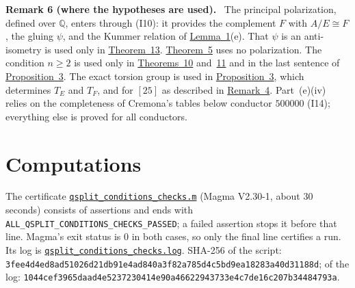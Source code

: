 \documentclass[11pt]{article}
\newenvironment{statement}[1]{\par\medskip\noindent\phantomsection\textbf{#1}\ }{\par\medskip}
\newcommand{\Q}{\mathbb Q}
\begin{document}
\begin{statement}{Remark 6 (where the hypotheses are used).}\label{rem-hyp}
The principal polarization, defined over \(\Q\), enters through (I10): it provides the complement \(F\) with
\(A/E\cong F\), the gluing \(\psi\), and the Kummer relation of \hyperref[lemma-gluing]{Lemma~1}(e). That \(\psi\) is
an anti-isometry is used only in \hyperref[thm-samej]{Theorem~13}. \hyperref[thm-isotypic]{Theorem~5} uses no
polarization. The condition \(n\ge2\) is used only in \hyperref[thm-22212]{Theorems~10} and~\hyperref[thm-228]{11} and in the
last sentence of \hyperref[prop-parents]{Proposition~3}.
The exact torsion group is used in \hyperref[prop-parents]{Proposition~3}, which determines \(T_E\) and \(T_F\), and
for \([25]\) as described in \hyperref[rem-trace]{Remark~4}. Part~(e)(iv) relies on the completeness of Cremona's
tables below conductor \(500000\) (I14); everything else is proved for all conductors.
\end{statement}

\section{Computations}\label{computations}

The certificate
\href{https://genus-2-torsion.github.io/data/knowledge/sources/qsplit_conditions_checks.m}{\texttt{qsplit\_conditions\_checks.m}}
(Magma V2.30-1, about \(30\) seconds) consists of assertions and ends with
\texttt{ALL\_QSPLIT\_CONDITIONS\_CHECKS\_PASSED}; a failed assertion stops it before that line. Magma's exit status is
\(0\) in both cases, so only the final line certifies a run. Its log is
\href{https://genus-2-torsion.github.io/data/knowledge/sources/qsplit_conditions_checks.log}{\texttt{qsplit\_conditions\_checks.log}}.
SHA-256 of the script:
\texttt{3fee4d4ed8ad5102\allowbreak 6d21db91e4ad840a\allowbreak 3f82a785d4c5bd9e\allowbreak a18283a40d31188d};
of the log:
\texttt{1044cef3965daad4\allowbreak e5237230414e90a4\allowbreak 6622943733e4c7de\allowbreak 16c207b34484793a}.
\end{document}
